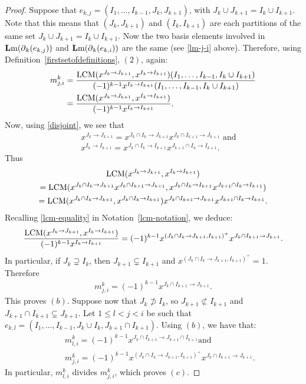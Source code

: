 \documentclass[ALCO]{cedram}
\newcommand{\lm}{\mbox{${\bf L}{\rm m}$}}
\newcommand{\dif}{\mbox{$\partial$}}
\newcommand{\Lcm}{\mbox{${\rm LCM}$}}
\begin{document}
\begin{proof}
Suppose that $e_{k,j}=(I_1,\ldots ,I_{k-1},J_{k},J_{k+1})$, with
$J_k\cup J_{k+1}=I_{k}\cup I_{k+1}$. Note that this means that
$(J_k,J_{k+1})$ and $(I_k,I_{k+1})$ are each partitions of the same
set $J_k\cup J_{k+1}=I_{k}\cup I_{k+1}$. Now the two basis elements
involved in $\lm(\dif_{k}(e_{k,j}))$ and $\lm(\dif_k(e_{k,i}))$ are
the same (see \eqref{lm-j-i} above). Therefore, using
Definition~\ref{firstsetofdefinitions}, $(2)$, again:
\begin{align*}
m^k_{j,i} &= \frac{\Lcm(x^{J_k\to J_{k+1}},x^{I_k\to
      I_{k+1}})(I_1,\ldots ,I_{k-1},I_{k}\cup
    I_{k+1})}{(-1)^{k-1}x^{I_k\to I_{k+1}}(I_1,\ldots
    ,I_{k-1},I_{k}\cup I_{k+1})}
 \\ &= \frac{\Lcm(x^{J_k\to
      J_{k+1}},x^{I_k\to I_{k+1}})}{(-1)^{k-1}x^{I_k\to I_{k+1}}}.
\end{align*}
Now, using \eqref{disjoint}, we see that
\begin{eqnarray*}
&&x^{J_k\to J_{k+1}}=x^{J_k\cap I_{k}\to J_{k+1}}x^{J_{k}\cap I_{k+1}\to
  J_{k+1}}\mbox{ and }\\&&x^{I_k\to I_{k+1}}=x^{J_k\cap I_k\to
  I_{k+1}}x^{J_{k+1}\cap I_k\to I_{k+1}}.
\end{eqnarray*}
Thus
\begin{multline*}
\Lcm(x^{J_k\to J_{k+1}},x^{I_k\to I_{k+1}}) \\
=\Lcm(x^{J_k\cap I_{k}\to J_{k+1}}x^{J_{k}\cap I_{k+1}\to J_{k+1}},x^{J_k\cap
I_k\to I_{k+1}}x^{J_{k+1}\cap I_k\to I_{k+1}})\\
= \Lcm(x^{J_k\cap I_{k}\to J_{k+1}},x^{J_k\cap I_k\to I_{k+1}})
  x^{J_{k}\cap I_{k+1}\to J_{k+1}}x^{J_{k+1}\cap I_k\to I_{k+1}}.
\end{multline*}
Recalling \eqref{lcm-equality} in Notation~\ref{lcm-notation}, we
deduce:
\begin{eqnarray*}
\frac{\Lcm(x^{J_k\to J_{k+1}},x^{I_k\to I_{k+1}})}{(-1)^{k-1}x^{I_k\to
    I_{k+1}}}= (-1)^{k-1}x^{(J_k\cap I_k\to J_{k+1},I_{k+1})^+}
x^{J_k\cap I_{k+1}\to J_{k+1}}.
\end{eqnarray*}
In particular, if $J_k\supsetneq I_k$, then $J_{k+1}\subsetneq
I_{k+1}$ and $x^{(J_k\cap I_k\to J_{k+1},I_{k+1})^+}=1$. Therefore
\begin{eqnarray*}
m^k_{j,i}=(-1)^{k-1}x^{J_k\cap I_{k+1}\to J_{k+1}}.
\end{eqnarray*}
This proves $(b)$. Suppose now that $J_k\not\supset I_k$, so
$J_{k+1}\not\subset I_{k+1}$ and $J_{k+1}\cap I_{k+1}\subsetneq
J_{k+1}$. Let $1\leq l<j<i$ be such that $e_{k,l}=(I_1,\ldots
,I_{k-1},J_k\cup I_k,J_{k+1}\cap I_{k+1})$. Using $(b)$, we have that:
\begin{eqnarray*}
&& m^k_{l,i}=(-1)^{k-1}x^{J_k\cap I_{k+1}\to J_{k+1}\cap I_{k+1}}\mbox{
  and }\\ && m^k_{j,i}=(-1)^{k-1}x^{(J_k\cap I_k\to J_{k+1},I_{k+1})^+}
x^{J_k\cap I_{k+1}\to J_{k+1}}.
\end{eqnarray*}
In particular, $m^k_{l,i}$ divides $m^k_{j,i}$, which proves $(c)$.
\end{proof}
\end{document}

